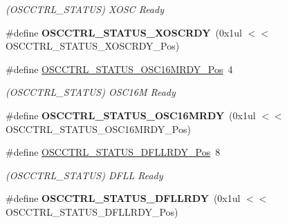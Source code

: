 \begin{DoxyCompactItemize}
\begin{DoxyCompactList}\small\item\em (O\+S\+C\+C\+T\+R\+L\+\_\+\+S\+T\+A\+T\+U\+S) X\+O\+S\+C Ready \end{DoxyCompactList}\item 
\hypertarget{group___s_a_m_l21___o_s_c_c_t_r_l_ga3253054354175e53215d76960a155c68}{}\#define {\bfseries O\+S\+C\+C\+T\+R\+L\+\_\+\+S\+T\+A\+T\+U\+S\+\_\+\+X\+O\+S\+C\+R\+D\+Y}~(0x1ul $<$$<$ O\+S\+C\+C\+T\+R\+L\+\_\+\+S\+T\+A\+T\+U\+S\+\_\+\+X\+O\+S\+C\+R\+D\+Y\+\_\+\+Pos)\label{group___s_a_m_l21___o_s_c_c_t_r_l_ga3253054354175e53215d76960a155c68}

\item 
\hypertarget{group___s_a_m_l21___o_s_c_c_t_r_l_ga5f6fc10e0a641c4700d3c2d610bfd3c7}{}\#define \hyperlink{group___s_a_m_l21___o_s_c_c_t_r_l_ga5f6fc10e0a641c4700d3c2d610bfd3c7}{O\+S\+C\+C\+T\+R\+L\+\_\+\+S\+T\+A\+T\+U\+S\+\_\+\+O\+S\+C16\+M\+R\+D\+Y\+\_\+\+Pos}~4\label{group___s_a_m_l21___o_s_c_c_t_r_l_ga5f6fc10e0a641c4700d3c2d610bfd3c7}

\begin{DoxyCompactList}\small\item\em (O\+S\+C\+C\+T\+R\+L\+\_\+\+S\+T\+A\+T\+U\+S) O\+S\+C16\+M Ready \end{DoxyCompactList}\item 
\hypertarget{group___s_a_m_l21___o_s_c_c_t_r_l_gaa6ff99c8114f85dd5d7633bcf27ead5e}{}\#define {\bfseries O\+S\+C\+C\+T\+R\+L\+\_\+\+S\+T\+A\+T\+U\+S\+\_\+\+O\+S\+C16\+M\+R\+D\+Y}~(0x1ul $<$$<$ O\+S\+C\+C\+T\+R\+L\+\_\+\+S\+T\+A\+T\+U\+S\+\_\+\+O\+S\+C16\+M\+R\+D\+Y\+\_\+\+Pos)\label{group___s_a_m_l21___o_s_c_c_t_r_l_gaa6ff99c8114f85dd5d7633bcf27ead5e}

\item 
\hypertarget{group___s_a_m_l21___o_s_c_c_t_r_l_ga93a88764e52b7292e9585f31459bab2e}{}\#define \hyperlink{group___s_a_m_l21___o_s_c_c_t_r_l_ga93a88764e52b7292e9585f31459bab2e}{O\+S\+C\+C\+T\+R\+L\+\_\+\+S\+T\+A\+T\+U\+S\+\_\+\+D\+F\+L\+L\+R\+D\+Y\+\_\+\+Pos}~8\label{group___s_a_m_l21___o_s_c_c_t_r_l_ga93a88764e52b7292e9585f31459bab2e}

\begin{DoxyCompactList}\small\item\em (O\+S\+C\+C\+T\+R\+L\+\_\+\+S\+T\+A\+T\+U\+S) D\+F\+L\+L Ready \end{DoxyCompactList}\item 
\hypertarget{group___s_a_m_l21___o_s_c_c_t_r_l_gabe546f5ff2ee10039bad82acc3f36c41}{}\#define {\bfseries O\+S\+C\+C\+T\+R\+L\+\_\+\+S\+T\+A\+T\+U\+S\+\_\+\+D\+F\+L\+L\+R\+D\+Y}~(0x1ul $<$$<$ O\+S\+C\+C\+T\+R\+L\+\_\+\+S\+T\+A\+T\+U\+S\+\_\+\+D\+F\+L\+L\+R\+D\+Y\+\_\+\+Pos)\label{group___s_a_m_l21___o_s_c_c_t_r_l_gabe546f5ff2ee10039bad82acc3f36c41}


\end{DoxyCompactItemize}
